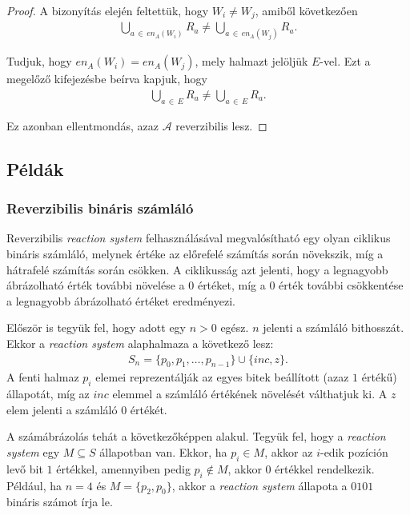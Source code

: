 \documentclass[12pt]{article}
\theoremstyle{definition}
\theoremstyle{remark}
\theoremstyle{plain}
\theoremstyle{plain}
\newcommand{\en}{\textit{en}}
\begin{document}
\begin{proof}
        A bizonyítás elején feltettük, hogy $W_{i} \neq W_{j}$, amiből következően
        \begin{align*}
            \bigcup\limits_{a \,\in\, \en_{A}(W_{i})} R_{a} \neq \bigcup\limits_{a \,\in\, \en_{A}(W_{j})} R_{a}.
        \end{align*}

        Tudjuk, hogy $\en_{A}(W_{i}) = \en_{A}(W_{j})$, mely halmazt jelöljük $E$-vel. Ezt a megelőző kifejezésbe beírva kapjuk, hogy
        \begin{align*}
            \bigcup\limits_{a \,\in\, E} R_{a} \neq \bigcup\limits_{a \,\in\, E} R_{a}.
        \end{align*}
        
        Ez azonban ellentmondás, azaz $\mathscr{A}$ reverzibilis lesz.
    \end{proof}

    \subsection*{Példák}

    \subsubsection*{Reverzibilis bináris számláló}

    Reverzibilis \textit{reaction system} felhasználásával megvalósítható egy olyan ciklikus bináris számláló, melynek értéke az előrefelé számítás során növekszik, míg a hátrafelé számítás során csökken. A ciklikusság azt jelenti, hogy a legnagyobb ábrázolható érték további növelése a $0$ értéket, míg a $0$ érték további csökkentése a legnagyobb ábrázolható értéket eredményezi.

    Először is tegyük fel, hogy adott egy $n > 0$ egész. $n$ jelenti a számláló bithosszát. Ekkor a \textit{reaction system} alaphalmaza a következő lesz:
    \begin{align*}
        S_{n} = \{ p_{0}, p_{1}, \ldots, p_{n - 1}\} \cup \{ \textit{inc}, z \}.
    \end{align*}
    A fenti halmaz $p_{i}$ elemei reprezentálják az egyes bitek beállított (azaz $1$ értékű) állapotát, míg az $\textit{inc}$ elemmel a számláló értékének növelését válthatjuk ki. A $z$ elem jelenti a számláló $0$ értékét.

    A számábrázolás tehát a következőképpen alakul. Tegyük fel, hogy a \textit{reaction system} egy $M \subseteq S$ állapotban van. Ekkor, ha $p_{i} \in M$, akkor az $i$-edik pozíción levő bit $1$ értékkel, amennyiben pedig $p_{i} \notin M$, akkor $0$ értékkel rendelkezik. Például, ha $n = 4$ és $M = \{p_{2}, p_{0}\}$, akkor a \textit{reaction system} állapota a $0101$ bináris számot írja le.
    
\end{document}
